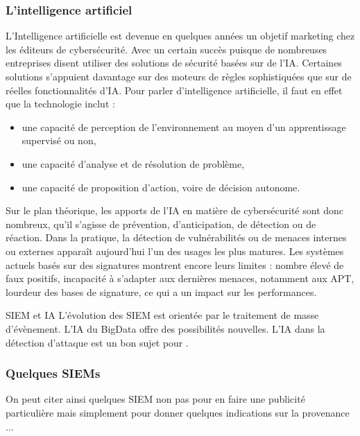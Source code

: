 \subsubsection{L'intelligence artificiel}


L’Intelligence artificielle est devenue en quelques années un objetif marketing chez les éditeurs de cybersécurité. Avec un certain succès puisque de nombreuses entreprises disent  utiliser des solutions de sécurité basées sur de l’IA. Certaines solutions s’appuient davantage sur des moteurs de règles sophistiquées que sur de réelles fonctionnalités d’IA. Pour parler d’intelligence artificielle, il faut en effet que la technologie inclut : 

\begin{itemize}
  \item  une capacité de perception de l’environnement au moyen d’un apprentissage supervisé ou non,
  \item  une capacité d’analyse et de résolution de problème, 
  \item   une capacité de proposition d’action, voire de décision autonome.
\end{itemize}

Sur le plan théorique, les apports de l’IA en matière de cybersécurité sont donc nombreux, qu’il s’agisse de prévention, d’anticipation, de détection ou de réaction. Dans la pratique, la détection de vulnérabilités ou de menaces internes ou externes apparaît aujourd’hui l’un des usages les plus matures.  Les systèmes actuels basés sur des signatures montrent encore leurs limites : nombre élevé de faux positifs, incapacité à s’adapter aux dernières menaces, notamment aux APT, lourdeur des bases de signature, ce qui a un impact sur les performances. 

\begin{techworkbox}{SIEM et IA}
L'évolution des SIEM est orientée par le traitement de masse d'évènement. L'IA du BigData offre des possibilités nouvelles.  L'IA dans la détection d'attaque est un bon sujet pour \fichetech.
\end{techworkbox}

\subsubsection{Quelques SIEMs}

On peut citer  ainsi quelques SIEM non pas pour en faire une publicité particulière mais simplement pour donner quelques indications sur la provenance ...

